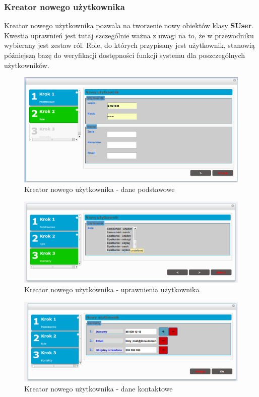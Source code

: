 \pagebreak
\subsubsection{Kreator nowego użytkownika}
	Kreator nowego użytkownika pozwala na tworzenie nowy obiektów klasy \textbf{SUser}. Kwestia uprawnień jest tutaj szczególnie ważna z uwagi na to, że w przewodniku wybierany jest zestaw ról. Role, do których przypisany jest użytkownik, stanowią późniejszą bazę do weryfikacji dostępności funkcji systemu dla poszczególnych użytkowników. 
	\begin{figure}[H]
		\centering
		\includegraphics[width=1.0\textwidth]{images/newUser-basic}
		\caption[Kreator nowego użytkownika - dane podstawowe]{
			Kreator nowego użytkownika - dane podstawowe	
		}
		\label{app:newUser_basic}
	\end{figure}	
	\begin{figure}[H]
		\centering
		\includegraphics[width=1.0\textwidth]{images/newUser-roles}
		\caption[Kreator nowego użytkownika - uprawnienia użytkownika]{
			Kreator nowego użytkownika - uprawnienia użytkownika
		}
		\label{app:newUser_roles}
	\end{figure}	
	\begin{figure}[H]
		\centering
		\includegraphics[width=1.0\textwidth]{images/newUser-contacts}
		\caption[Kreator nowego użytkownika - dane kontaktowe]{
			Kreator nowego użytkownika - dane kontaktowe
		}
		\label{app:newUser_contacts}
	\end{figure}	

